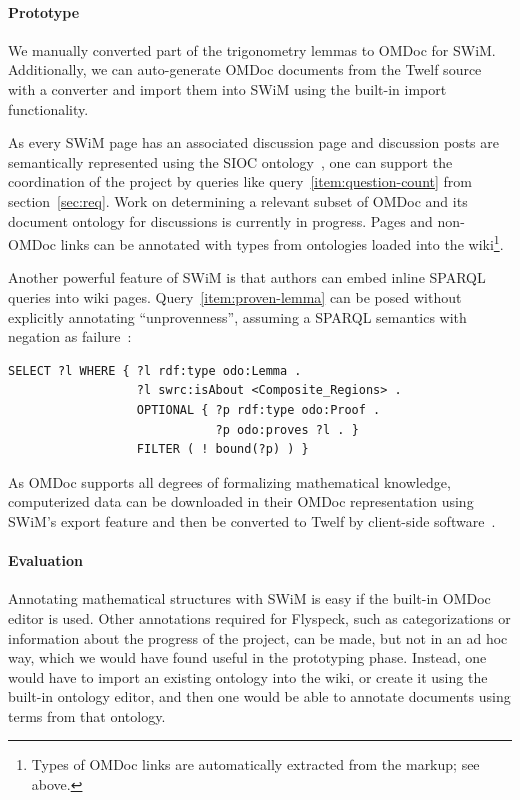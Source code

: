 \paragraph{Prototype} We manually converted part of the trigonometry lemmas to
OMDoc for SWiM.  Additionally, we can auto-generate OMDoc documents from the
Twelf source with a converter and import them into SWiM using the built-in
import functionality.

As every SWiM page has an associated discussion page and discussion posts are
semantically represented using the SIOC ontology~\cite{SIOC:web}, one can support
the coordination of the project by queries like query~\ref{item:question-count}
from section~\ref{sec:req}.  Work on determining a relevant subset of OMDoc and
its document ontology for discussions is currently in progress.  Pages and non-OMDoc
links can be annotated with types from ontologies loaded into the
wiki\footnote{Types of OMDoc links are automatically extracted from the markup;
  see above.}.

Another powerful feature of SWiM is that authors can embed inline SPARQL queries
into wiki pages.  Query~\ref{item:proven-lemma} can be posed without explicitly
annotating ``unprovenness'', assuming a SPARQL semantics with negation as
failure~\cite{Polleres:SPARQL-Rules07}:

\begin{lstlisting}
SELECT ?l WHERE { ?l rdf:type odo:Lemma .
                  ?l swrc:isAbout <Composite_Regions> .
                  OPTIONAL { ?p rdf:type odo:Proof .
                             ?p odo:proves ?l . }
                  FILTER ( ! bound(?p) ) }
\end{lstlisting}

As OMDoc supports all degrees of formalizing mathematical knowledge,
computerized data can be downloaded in their OMDoc representation using SWiM's
export feature and then be converted to Twelf by client-side
software~\cite[chap.\ 25.2]{Kohlhase:omdoc1.2}.

\paragraph{Evaluation} Annotating mathematical structures with SWiM is easy if
the built-in OMDoc editor is used.  Other annotations required for Flyspeck,
such as categorizations or information about the progress of the project, can be
made, but not in an ad hoc way, which we would have found useful in the
prototyping phase.  Instead, one would have to import an existing ontology into
the wiki, or create it using the built-in ontology editor, and then one would be
able to annotate documents using terms from that ontology.

